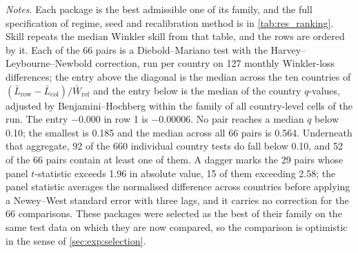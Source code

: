 \begin{table}[t]
\vspace{4pt}
{\footnotesize
\begin{minipage}{0.98\textwidth}
\textit{Notes.} Each package is the best admissible one of its family, and the full
specification of regime, seed and recalibration method is in
\cref{tab:res_ranking}. Skill repeats the median Winkler skill from that table, and
the rows are ordered by it. Each of the 66 pairs is a Diebold--Mariano test with the
Harvey--Leybourne--Newbold correction, run per country on 127 monthly Winkler-loss
differences; the entry above the diagonal is the median across the ten countries of
$(\bar L_{\mathrm{row}}-\bar L_{\mathrm{col}})/\bar W_{\mathrm{ref}}$ and the entry
below is the median of the country $q$-values, adjusted by Benjamini--Hochberg
within the family of all country-level cells of the run. The entry $-0.000$ in row 1
is $-0.00006$. No pair reaches a median $q$ below 0.10; the smallest is 0.185 and
the median across all 66 pairs is 0.564. Underneath that aggregate, 92 of the 660
individual country tests do fall below 0.10, and 52 of the 66 pairs contain at least
one of them. A dagger marks the 29 pairs whose panel $t$-statistic exceeds 1.96 in
absolute value, 15 of them exceeding 2.58; the panel statistic averages the
normalised difference across countries before applying a Newey--West standard error
with three lags, and it carries no correction for the 66 comparisons. These packages
were selected as the best of their family on the same test data on which they are now
compared, so the comparison is optimistic in the sense of \cref{sec:exp:selection}.
\end{minipage}}
\end{table}

